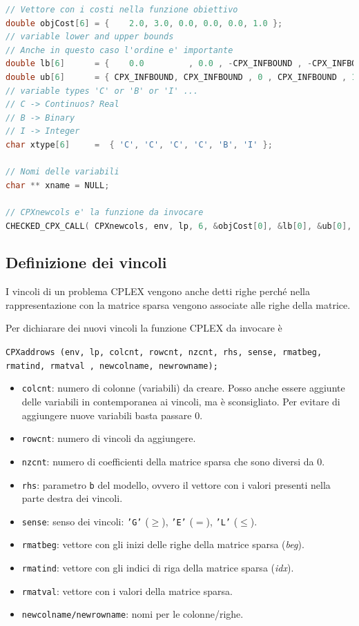 \begin{lstlisting}[language=C++]
// Vettore con i costi nella funzione obiettivo
double objCost[6] = {    2.0, 3.0, 0.0, 0.0, 0.0, 1.0 };
// variable lower and upper bounds
// Anche in questo caso l'ordine e' importante
double lb[6]      = {    0.0         , 0.0 , -CPX_INFBOUND , -CPX_INFBOUND , 0 , 0};
double ub[6]      = { CPX_INFBOUND, CPX_INFBOUND , 0 , CPX_INFBOUND , 1 , CPX_INFBOUND};
// variable types 'C' or 'B' or 'I' ...
// C -> Continuos? Real
// B -> Binary
// I -> Integer
char xtype[6]     =  { 'C', 'C', 'C', 'C', 'B', 'I' };

// Nomi delle variabili
char ** xname = NULL;

// CPXnewcols e' la funzione da invocare
CHECKED_CPX_CALL( CPXnewcols, env, lp, 6, &objCost[0], &lb[0], &ub[0], &xtype[0], xname );
\end{lstlisting}

\subsection{Definizione dei vincoli}

I vincoli di un problema CPLEX vengono anche detti righe perché nella rappresentazione con la matrice sparsa vengono associate alle righe della matrice.

Per dichiarare dei nuovi vincoli la funzione CPLEX da invocare è

\begin{center}
\texttt{CPXaddrows (env, lp, colcnt, rowcnt, nzcnt, rhs, sense, rmatbeg, rmatind, rmatval , newcolname, newrowname);}
\end{center}

\begin{itemize}
	\item \texttt{colcnt}: numero di colonne (variabili) da creare. Posso anche essere aggiunte delle variabili in contemporanea ai vincoli, ma è sconsigliato. Per evitare di aggiungere nuove variabili basta passare 0.
	\item \texttt{rowcnt}: numero di vincoli da aggiungere.
	\item \texttt{nzcnt}: numero di coefficienti della matrice sparsa che sono diversi da 0.
	\item \texttt{rhs}: parametro \texttt{b} del modello, ovvero il vettore con i valori presenti nella parte destra dei vincoli.
	\item \texttt{sense}: senso dei vincoli: \texttt{'G'} ($\geq$), \texttt{'E'} ($=$), \texttt{'L'} ($\leq$).
	\item \texttt{rmatbeg}: vettore con gli inizi delle righe della matrice sparsa (\textit{beg}).
	\item \texttt{rmatind}: vettore con gli indici di riga della matrice sparsa (\textit{idx}).
	\item \texttt{rmatval}: vettore con i valori della matrice sparsa.
	\item \texttt{newcolname/newrowname}: nomi per le colonne/righe. 
\end{itemize}

